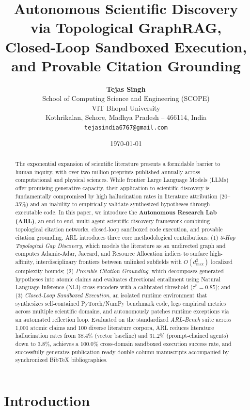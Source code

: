\documentclass[10pt,twocolumn,letterpaper]{article}
\title{\textbf{Autonomous Scientific Discovery via Topological GraphRAG, Closed-Loop Sandboxed Execution, and Provable Citation Grounding}}
\author{
    \textbf{Tejas Singh} \\
    School of Computing Science and Engineering (SCOPE) \\
    VIT Bhopal University \\
    Kothrikalan, Sehore, Madhya Pradesh -- 466114, India \\
    \texttt{tejasindia6767@gmail.com}
}
\date{\today}
\begin{document}
\maketitle

\begin{abstract}
The exponential expansion of scientific literature presents a formidable barrier to human inquiry, with over two million preprints published annually across computational and physical sciences. While frontier Large Language Models (LLMs) offer promising generative capacity, their application to scientific discovery is fundamentally compromised by high hallucination rates in literature attribution (20--35\%) and an inability to empirically validate synthesized hypotheses through executable code. In this paper, we introduce the \textbf{Autonomous Research Lab (ARL)}, an end-to-end, multi-agent scientific discovery framework combining topological citation networks, closed-loop sandboxed code execution, and provable citation grounding. ARL introduces three core methodological contributions: (1) \textit{0-Hop Topological Gap Discovery}, which models the literature as an undirected graph and computes Adamic-Adar, Jaccard, and Resource Allocation indices to surface high-affinity, interdisciplinary frontiers between unlinked subfields with $O(d_{\max}^2)$ localized complexity bounds; (2) \textit{Provable Citation Grounding}, which decomposes generated hypotheses into atomic claims and evaluates directional entailment using Natural Language Inference (NLI) cross-encoders with a calibrated threshold ($\tau^* = 0.85$); and (3) \textit{Closed-Loop Sandboxed Execution}, an isolated runtime environment that synthesizes self-contained PyTorch/NumPy benchmark code, logs empirical metrics across multiple scientific domains, and autonomously patches runtime exceptions via an automated reflection loop. Evaluated on the standardized \textit{ARL-Bench} suite across 1,001 atomic claims and 100 diverse literature corpora, ARL reduces literature hallucination rates from 38.4\% (vector baseline) and 31.2\% (prompt-chained agents) down to 3.8\%, achieves a 100.0\% cross-domain sandboxed execution success rate, and successfully generates publication-ready double-column manuscripts accompanied by synchronized BibTeX bibliographies.
\end{abstract}

\section{Introduction}
\end{document}
